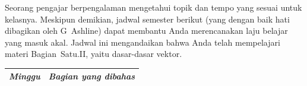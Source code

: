 {Seorang pengajar berpengalaman mengetahui topik dan
tempo yang sesuai untuk kelasnya. Meskipun demikian, jadwal semester berikut
(yang dengan baik hati dibagikan oleh G~Ashline)
dapat membantu Anda merencanakan laju belajar yang masuk akal.
Jadwal ini mengandaikan bahwa Anda telah mempelajari materi
Bagian~Satu.II, yaitu dasar-dasar vektor.
\begin{center} 
   \begin{tabular}{r|l}
      \multicolumn{1}{r}{\textit{Minggu}}
       &\textit{Bagian yang dibahas}        \\ \hline

\end{tabular}
\end{center}}

